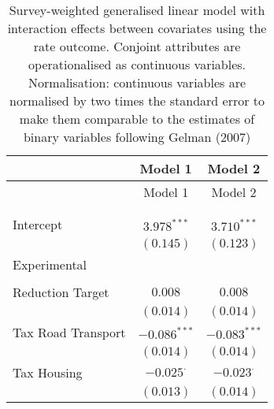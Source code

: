 
\usepackage{longtable}

\begin{center}
\begin{tiny}
\begin{longtable}{l@{} c@{} c@{}}
\hline
 & Model 1 & Model 2 \\
\hline
\endfirsthead
\hline
 & Model 1 & Model 2 \\
\hline
\endhead
\hline
\endfoot
\hline
\multicolumn{3}{l}{\tiny{$^{***}p<0.001$; $^{**}p<0.01$; $^{*}p<0.05$; $^{\cdot}p<0.1$}}\\
\caption{Survey-weighted generalised linear model with interaction effects between covariates using the rate outcome. Conjoint attributes are operationalised as continuous variables. Normalisation: continuous variables are normalised by two times
               the standard error to make them comparable to the estimates of binary variables following Gelman (2007)}
\label{table:weighted_interactions_benefit_EV_left_right_sal}
\endlastfoot \\
Intercept                                                                & $3.978^{***}$    & $3.710^{***}$    \\
                                                                         & $(0.145)$        & $(0.123)$        \\
Experimental                                                             &                  &                  \\
                                                                         &                  &                  \\
\quad Reduction Target                                                   & $0.008$          & $0.008$          \\
                                                                         & $(0.014)$        & $(0.014)$        \\
\quad Tax Road Transport                                                 & $-0.086^{***}$   & $-0.083^{***}$   \\
                                                                         & $(0.014)$        & $(0.014)$        \\
\quad Tax Housing                                                        & $-0.025^{\cdot}$ & $-0.023^{\cdot}$ \\
                                                                         & $(0.013)$        & $(0.014)$        \\

\end{longtable}
\end{tiny}
\end{center}
